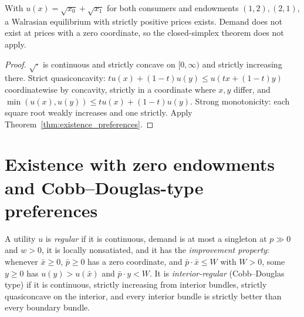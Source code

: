 \begin{theorem}
\label{thm:sqrt_economy}
\leanok
{}
With $u(x) = \sqrt{x_0} + \sqrt{x_1}$ for both consumers and endowments $(1,2), (2,1)$, a Walrasian equilibrium with
strictly positive prices exists. Demand does not exist at prices with a zero coordinate, so the closed-simplex theorem
does not apply.
\end{theorem}
\begin{proof}
\leanok
$\sqrt{\cdot}$ is continuous and strictly concave on $[0, \infty)$ and strictly increasing there. Strict quasiconcavity:
$t u(x) + (1 - t) u(y) \le u(tx + (1-t)y)$ coordinatewise by concavity, strictly in a coordinate where $x, y$ differ, and
$\min(u(x), u(y)) \le t u(x) + (1-t) u(y)$. Strong monotonicity: each square root weakly increases and one strictly. Apply
Theorem~\ref{thm:existence_preferences}.
\end{proof}

\section{Existence with zero endowments and Cobb--Douglas-type preferences}
\label{sec:existence_regular}

\begin{definition}
\label{def:regular_utility}
\leanok
A utility $u$ is \emph{regular} if it is continuous, demand is at most a singleton at $p \gg 0$ and $w > 0$, it is locally
nonsatiated, and it has the \emph{improvement property}: whenever $\bar x \ge 0$, $\bar p \ge 0$ has a zero coordinate, and
$\bar p \cdot \bar x \le W$ with $W > 0$, some $y \ge 0$ has $u(y) > u(\bar x)$ and $\bar p \cdot y < W$. It is
\emph{interior-regular} (Cobb--Douglas type) if it is continuous, strictly increasing from interior bundles, strictly
quasiconcave on the interior, and every interior bundle is strictly better than every boundary bundle.
\end{definition}


